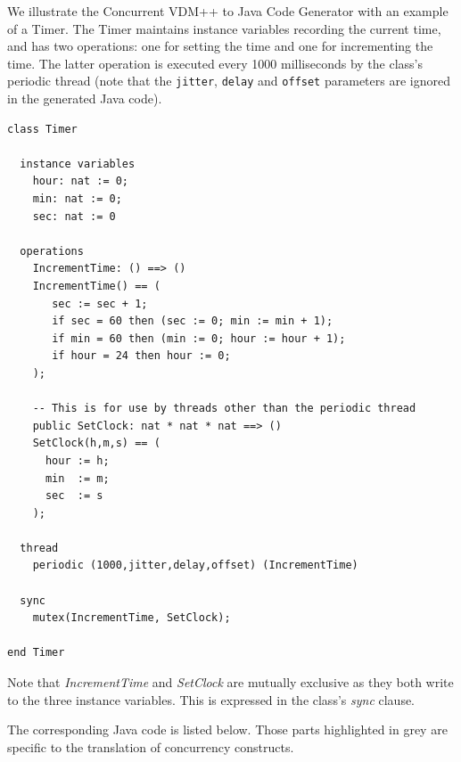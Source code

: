\documentclass[\pformat,11pt]{article}
\newcommand{\cg}{VDM++ to Java Code Generator}
\newcommand{\ccg}{Concurrent \cg}
\begin{document}
We illustrate the \ccg{} with an example of a Timer. The Timer maintains
instance variables recording the current time, and has two operations:
one for setting the time and one for incrementing the time. The latter
operation is executed every 1000 milliseconds by the class's periodic
thread (note that the \texttt{jitter}, \texttt{delay} and
\texttt{offset} parameters are ignored in the generated Java code). 
\begin{verbatim}
class Timer

  instance variables
    hour: nat := 0;
    min: nat := 0;
    sec: nat := 0
  
  operations
    IncrementTime: () ==> ()
    IncrementTime() == (
       sec := sec + 1;
       if sec = 60 then (sec := 0; min := min + 1);
       if min = 60 then (min := 0; hour := hour + 1);
       if hour = 24 then hour := 0;
    );
  
    -- This is for use by threads other than the periodic thread
    public SetClock: nat * nat * nat ==> ()
    SetClock(h,m,s) == ( 
      hour := h;
      min  := m;
      sec  := s
    );
  
  thread
    periodic (1000,jitter,delay,offset) (IncrementTime)

  sync 
    mutex(IncrementTime, SetClock);
   
end Timer
\end{verbatim}
Note that \textit{IncrementTime} and \textit{SetClock} are mutually
exclusive as they both write to the three instance variables. This is
expressed in the class's \textit{sync} clause.

The corresponding Java code is listed below. Those parts highlighted
in grey are specific to the translation of concurrency constructs.
\end{document}
